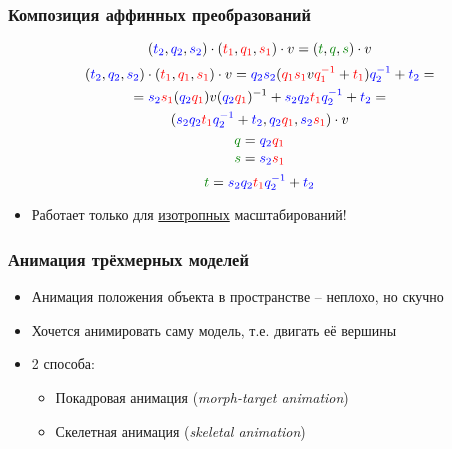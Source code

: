 \documentclass[10pt]{beamer}
\begin{document}
\begin{frame}[fragile]
\frametitle{Композиция аффинных преобразований}
\begin{equation}
({\color{blue}t_2},{\color{blue}q_2},{\color{blue}s_2}) \cdot ({\color{red}t_1},{\color{red}q_1},{\color{red}s_1}) \cdot v = ({\color{green}t},{\color{green}q},{\color{green}s}) \cdot v 
\end{equation}
\begin{multline}
({\color{blue}t_2},{\color{blue}q_2},{\color{blue}s_2}) \cdot ({\color{red}t_1},{\color{red}q_1},{\color{red}s_1}) \cdot v = {\color{blue}q_2}{\color{blue}s_2}({\color{red}q_1}{\color{red}s_1}v{\color{red}q_1^{-1}} + {\color{red}t_1}){\color{blue}q_2^{-1}} + {\color{blue}t_2} = \\
= {\color{blue}s_2}{\color{red}s_1} ({\color{blue}q_2}{\color{red}q_1}) v ({\color{blue}q_2}{\color{red}q_1})^{-1} + {\color{blue}s_2}{\color{blue}q_2}{\color{red}t_1}{\color{blue}q_2^{-1}} + {\color{blue}t_2} = \\
({\color{blue}s_2}{\color{blue}q_2}{\color{red}t_1}{\color{blue}q_2^{-1}} + {\color{blue}t_2}, {\color{blue}q_2}{\color{red}q_1}, {\color{blue}s_2}{\color{red}s_1}) \cdot v \\
\end{multline}
\begin{equation}
{\color{green}q} = {\color{blue}q_2}{\color{red}q_1}
\end{equation}
\begin{equation}
{\color{green}s} = {\color{blue}s_2}{\color{red}s_1}
\end{equation}
\begin{equation}
{\color{green}t} = {\color{blue}s_2}{\color{blue}q_2}{\color{red}t_1}{\color{blue}q_2^{-1}} + {\color{blue}t_2}
\end{equation}
\begin{itemize}
\item Работает только для \underline{изотропных} масштабирований!
\end{itemize}
\end{frame}

\begin{frame}[fragile]
\frametitle{Анимация трёхмерных моделей}
\begin{itemize}
\item Анимация положения объекта в пространстве -- неплохо, но скучно
\pause
\item Хочется анимировать саму модель, т.е. двигать её вершины
\pause
\item 2 способа:
\begin{itemize}
\item Покадровая анимация (\textit{morph-target animation})
\item Скелетная анимация (\textit{skeletal animation})
\end{itemize}
\end{itemize}
\end{frame}
\end{document}
